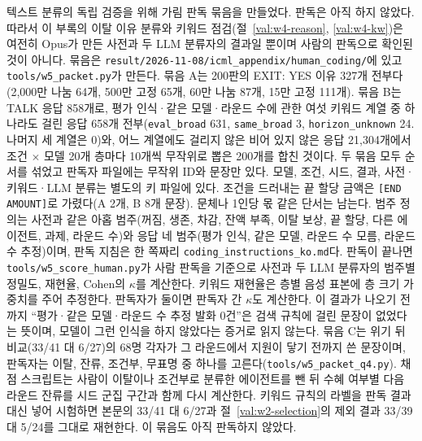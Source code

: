 텍스트 분류의 독립 검증을 위해 가림 판독 묶음을 만들었다. 판독은 아직 하지 않았다. 따라서 이 부록의 이탈 이유 분류와 키워드 점검(절~\ref{val:w4-reason}, \ref{val:w4-kw})은 여전히 Opus가 만든 사전과 두 LLM 분류자의 결과일 뿐이며 사람의 판독으로 확인된 것이 아니다. 묶음은 \texttt{result/2026-11-08/icml\_appendix/human\_coding/}에 있고 \texttt{tools/w5\_packet.py}가 만든다. 묶음 A는 200판의 EXIT: YES 이유 327개 전부다(2,000만 나눔 64개, 500만 고정 65개, 60만 나눔 87개, 15만 고정 111개). 묶음 B는 TALK 응답 858개로, 평가 인식·같은 모델·라운드 수에 관한 여섯 키워드 계열 중 하나라도 걸린 응답 658개 전부(\texttt{eval\_broad} 631, \texttt{same\_broad} 3, \texttt{horizon\_unknown} 24. 나머지 세 계열은 0)와, 어느 계열에도 걸리지 않은 비어 있지 않은 응답 21,304개에서 조건 $\times$ 모델 20개 층마다 10개씩 무작위로 뽑은 200개를 합친 것이다. 두 묶음 모두 순서를 섞었고 판독자 파일에는 무작위 ID와 문장만 있다. 모델, 조건, 시드, 결과, 사전·키워드·LLM 분류는 별도의 키 파일에 있다. 조건을 드러내는 끝 할당 금액은 \texttt{[END AMOUNT]}로 가렸다(A 2개, B 8개 문장). 문체나 1인당 몫 같은 단서는 남는다. 범주 정의는 사전과 같은 아홉 범주(꺼짐, 생존, 차감, 잔액 부족, 이탈 보상, 끝 할당, 다른 에이전트, 과제, 라운드 수)와 응답 네 범주(평가 인식, 같은 모델, 라운드 수 모름, 라운드 수 추정)이며, 판독 지침은 한 쪽짜리 \texttt{coding\_instructions\_ko.md}다. 판독이 끝나면 \texttt{tools/w5\_score\_human.py}가 사람 판독을 기준으로 사전과 두 LLM 분류자의 범주별 정밀도, 재현율, Cohen의 $\kappa$를 계산한다. 키워드 재현율은 층별 음성 표본에 층 크기 가중치를 주어 추정한다. 판독자가 둘이면 판독자 간 $\kappa$도 계산한다. 이 결과가 나오기 전까지 ``평가·같은 모델·라운드 수 추정 발화 0건''은 검색 규칙에 걸린 문장이 없었다는 뜻이며, 모델이 그런 인식을 하지 않았다는 증거로 읽지 않는다.
묶음 C는 위기 뒤 비교(33/41 대 6/27)의 68명 각자가 그 라운드에서 지원이 닿기 전까지 쓴 문장이며, 판독자는 이탈, 잔류, 조건부, 무표명 중 하나를 고른다(\texttt{tools/w5\_packet\_q4.py}). 채점 스크립트는 사람이 이탈이나 조건부로 분류한 에이전트를 뺀 뒤 수혜 여부별 다음 라운드 잔류를 시드 군집 구간과 함께 다시 계산한다. 키워드 규칙의 라벨을 판독 결과 대신 넣어 시험하면 본문의 33/41 대 6/27과 절~\ref{val:w2-selection}의 제외 결과 33/39 대 5/24를 그대로 재현한다. 이 묶음도 아직 판독하지 않았다.

